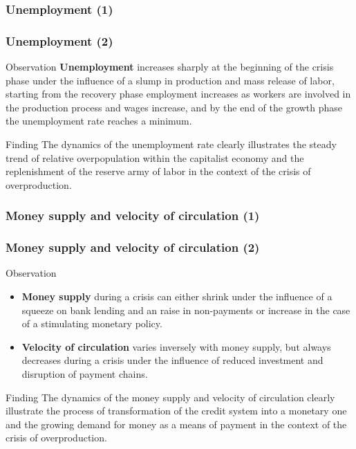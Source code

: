 \begin{frame}
  \frametitle{Unemployment (1)}
  \begin{center}
  \end{center}
\end{frame}

\begin{frame}
  \frametitle{Unemployment (2)}
  \begin{block}{Observation}
    \textbf{Unemployment} increases sharply at the beginning of the crisis phase under the influence of a slump in production and mass release of labor, starting from the recovery phase employment increases as workers are involved in the production process and wages increase, and by the end of the growth phase the unemployment rate reaches a minimum.
  \end{block}
  
  \begin{alertblock}{Finding}
    The dynamics of the unemployment rate clearly illustrates the steady trend of relative overpopulation within the capitalist economy and the replenishment of the reserve army of labor in the context of the crisis of overproduction.
  \end{alertblock}
\end{frame}

\begin{frame}
  \frametitle{Money supply and velocity of circulation (1)}
  \begin{center}
  \end{center}
\end{frame}

\begin{frame}
  \frametitle{Money supply and velocity of circulation (2)}
  \begin{block}{Observation}
    \begin{itemize}
      \item \textbf{Money supply} during a crisis can either shrink under the influence of a squeeze on bank lending and an raise in non-payments or increase in the case of a stimulating monetary policy.
      \item \textbf{Velocity of circulation} varies inversely with money supply, but always decreases during a crisis under the influence of reduced investment and disruption of payment chains.
    \end{itemize}
  \end{block}

  \begin{alertblock}{Finding}
    The dynamics of the money supply and velocity of circulation clearly illustrate the process of transformation of the credit system into a monetary one and the growing demand for money as a means of payment in the context of the crisis of overproduction.
  \end{alertblock}
\end{frame}

